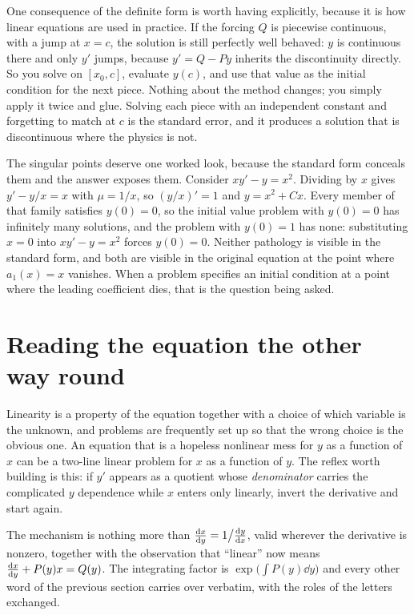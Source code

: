 One consequence of the definite form is worth having explicitly, because it is how linear equations are used in practice. If the forcing $Q$ is piecewise continuous, with a jump at $x=c$, the solution is still perfectly well behaved: $y$ is continuous there and only $y'$ jumps, because $y'=Q-Py$ inherits the discontinuity directly. So you solve on $[x_0,c]$, evaluate $y(c)$, and use that value as the initial condition for the next piece. Nothing about the method changes; you simply apply it twice and glue. Solving each piece with an independent constant and forgetting to match at $c$ is the standard error, and it produces a solution that is discontinuous where the physics is not.

The singular points deserve one worked look, because the standard form conceals them and the answer exposes them. Consider $xy'-y=x^{2}$. Dividing by $x$ gives $y'-y/x=x$ with $\mu=1/x$, so $(y/x)'=1$ and $y=x^{2}+Cx$. Every member of that family satisfies $y(0)=0$, so the initial value problem with $y(0)=0$ has infinitely many solutions, and the problem with $y(0)=1$ has none: substituting $x=0$ into $xy'-y=x^{2}$ forces $y(0)=0$. Neither pathology is visible in the standard form, and both are visible in the original equation at the point where $a_1(x)=x$ vanishes. When a problem specifies an initial condition at a point where the leading coefficient dies, that is the question being asked.

\section{Reading the equation the other way round}

Linearity is a property of the equation together with a choice of which variable is the unknown, and problems are frequently set up so that the wrong choice is the obvious one. An equation that is a hopeless nonlinear mess for $y$ as a function of $x$ can be a two-line linear problem for $x$ as a function of $y$. The reflex worth building is this: if $y'$ appears as a quotient whose \emph{denominator} carries the complicated $y$ dependence while $x$ enters only linearly, invert the derivative and start again.

The mechanism is nothing more than $\frac{\mathrm{d}x}{\mathrm{d}y}=1\big/\frac{\mathrm{d}y}{\mathrm{d}x}$, valid wherever the derivative is nonzero, together with the observation that ``linear'' now means $\frac{\mathrm{d}x}{\mathrm{d}y}+P(y)x=Q(y)$. The integrating factor is $\exp\bigl(\int P(y)\dd y\bigr)$ and every other word of the previous section carries over verbatim, with the roles of the letters exchanged.

